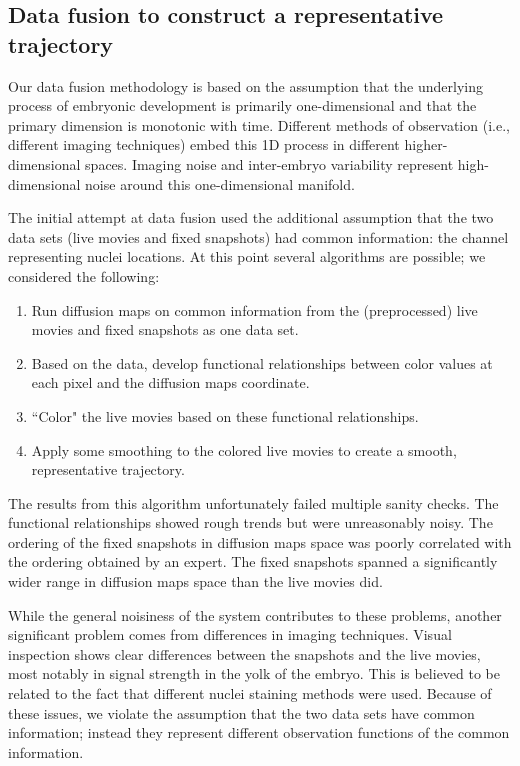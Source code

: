 \documentclass[12pt]{article}
\begin{document}
\subsection{Data fusion to construct a representative trajectory}

Our data fusion methodology is based on the assumption that the underlying process of embryonic development is primarily one-dimensional and that the primary dimension is monotonic with time. Different methods of observation (i.e., different imaging techniques) embed this 1D process in different higher-dimensional spaces. Imaging noise and inter-embryo variability represent high-dimensional noise around this one-dimensional manifold.\vspace{1mm}

The initial attempt at data fusion used the additional assumption that the two data sets (live movies and fixed snapshots) had common information: the channel representing nuclei locations. At this point several algorithms are possible; we considered the following:

\begin{enumerate}
\item Run diffusion maps on common information from the (preprocessed) live movies and fixed snapshots as one data set.
\item Based on the data, develop functional relationships between color values at each pixel and the diffusion maps coordinate.
\item ``Color" the live movies based on these functional relationships.
\item Apply some smoothing to the colored live movies to create a smooth, representative trajectory.
\end{enumerate}

The results from this algorithm unfortunately failed multiple sanity checks. The functional relationships showed rough trends but were unreasonably noisy. The ordering of the fixed snapshots in diffusion maps space was poorly correlated with the ordering obtained by an expert. The fixed snapshots spanned a significantly wider range in diffusion maps space than the live movies did. \vspace{1mm}

While the general noisiness of the system contributes to these problems, another significant problem comes from differences in imaging techniques. Visual inspection shows clear differences between the snapshots and the live movies, most notably in signal strength in the yolk of the embryo. This is believed to be related to the fact that different nuclei staining methods were used. Because of these issues, we violate the assumption that the two data sets have common information; instead they represent different observation functions of the common information. \vspace{1mm}
\end{document}
